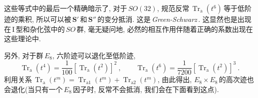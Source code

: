 这些等式中的最后一个精确暗示了, 对于$\,SO(32)$, 规范反常$\,\operatorname{Tr}_{\text{a}}(t^{6})\,$等于低阶迹的乘积, 所以可以被$\,\bm{S}'\,$和$\,\bm{S}''\,$的变分抵消. 这是\,\emph{Green-Schwarz}\,{}. 这显然也是出现在\,I\,型和杂化弦中的$\,SO\,$群, 毫无疑问地, 必然的相互作用伴随着正确的系数出现在这些理论中.

另外, 对于群$\,E_{8}$, 六阶迹可以退化至低阶迹,
\begin{equation}
    \operatorname{Tr}_{\text{a}}(t^{4}) = \frac{1}{100}[\operatorname{Tr}_{\text{a}}(t^{2})]^{2} \:, \qquad
    \operatorname{Tr}_{\text{a}}(t^{6}) = \frac{1}{7200}[\operatorname{Tr}_{\text{a}}(t^{2})]^{3} \:. \label{12.2.20}
\end{equation}
利用关系$\,\operatorname{Tr}_{\text{a}}(t^{m})=\operatorname{Tr}_{\text{a1}}(t^{m})+\operatorname{Tr}_{\text{a2}}(t^{m})$, 由此得出, $E_{8}\times E_{8}\,$的高次迹也会退化(当只有一个$\,E_{8}\,$因子时, {}反常不会抵消, 我们会在下面看到这点).

